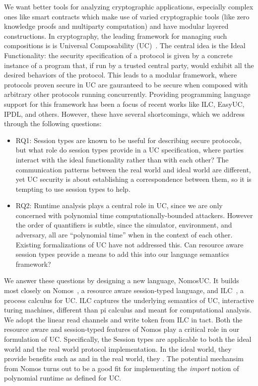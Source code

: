 We want better tools for analyzing cryptographic applications, especially complex ones like smart contracts which make use of varied cryptographic tools (like zero knowledge proofs and multiparty computation) and have modular layered constructions.
In cryptography, the leading framework for managing such compositions is is Universal Composability (UC)~\cite{uc}.
The central idea is the Ideal Functionality: the security specification of a protocol is given by a concrete instance of a program that, if run by a trusted central party, would exhibit all the desired behaviors of the protocol.
This leads to a modular framework, where protocols proven secure in UC are gauranteed to be secure when composed with arbitrary other protocols running concurrently.
Providing programming language support for this framework has been a focus of recent works like ILC, EasyUC, IPDL, and others. However, these have several shortcomings, which we address through the following questions:

\begin{itemize}
\item RQ1: Session types are known to be useful for describing secure protocols, but what role do session types provide in a UC specification, where parties interact with the ideal functionality rather than with each other? The communication patterns between the real world and ideal world are different, yet UC security is about establishing a correspondence between them, so it is tempting to use session types to help.

\item RQ2: Runtime analysis plays a central role in UC, since we are only concerned with polynomial time computationally-bounded attackers. However the order of quantifiers is subtle, since the simulator, environment, and adversary, all are ``polynomial time'' when in the context of each other. Existing formalizations of UC have not addressed this.
Can resource aware session types provide a means to add this into our language semantics framework?
\end{itemize}

We answer these questions by designing a new language, NomosUC. It builds most closely on Nomos~\cite{dasnomos}, a resource aware session-typed language, and ILC~\cite{ilc}, a process calculus for UC. ILC captures the underlying semantics of UC, interactive turing machines, different than pi calculus and meant for computational analysis. We adopt the linear read channels and write token from ILC in tact.
Both the resource aware and session-typed features of Nomos play a critical role in our formulation of UC.
Specifically, the Session types are applicable to both the ideal world and the real world protocol implementation.
In the ideal world, they provide benefits such as  and in the real world, they .
The potential mechansim from Nomos turns out to be a good fit for implementing the \textit{import} notion of polynomial runtime as defined for UC.


